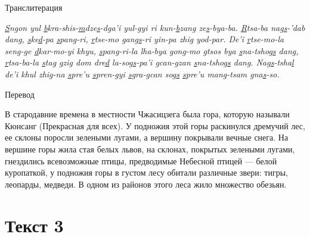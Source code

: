 \begin{center}Транслитерация\end{center}

\emph{\ul{S}ngon yul \ul{b}kra-shis-\ul{m}dze\ul{s}-dga'i yul-gyi ri kun-\ul{b}zang ze\ul{s}-bya-ba. \ul{R}tsa-ba nag\ul{s}-'dab dang, \ul{s}ke\ul{d}-pa \ul{s}pang-ri, \ul{r}tse-mo gang\ul{s}-ri yin-pa zhig yod-par.
De'i \ul{r}tse-mo-la seng-ge \ul{d}kar-mo-yi khyu, \ul{s}pang-ri-la lha-bya gong-mo \ul{g}tsos bya \ul{s}na-tshog\ul{s} dang, \ul{r}tsa-ba-la \ul{s}tag \ul{g}zig dom dre\ul{d} la-sog\ul{s}-pa'i \ul{g}can-\ul{g}zan \ul{s}na-tshog\ul{s} dang.
Nag\ul{s}-tsha\ul{l} de'i khul zhig-na \ul{s}pre'u \ul{s}pren-gyi \ul{s}gra-\ul{g}can sog\ul{s} \ul{s}pre'u mang-tsam gna\ul{s}-so.
}

\begin{center}Перевод\end{center}

В стародавние времена в местности Чжасицзега была гора, которую называли Кюнсанг (Прекрасная для всех). У подножия этой горы раскинулся дремучий лес, ее склоны поросли зелеными лугами, а вершину покрывали вечные снега. На вершине горы жила стая белых львов, на склонах, покрытых зелеными лугами, гнездились всевозможные птицы, предводимые Небесной птицей --- белой куропаткой, у подножия горы в густом лесу обитали различные звери: тигры, леопарды, медведи. В одном из районов этого леса жило множество обезьян.

\section{Текст 3}


